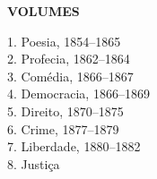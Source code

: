 \begingroup\footnotesize\parindent0pt\vspace*{3em}

\thispagestyle{empty}
{\formular\bfseries VOLUMES}\smallskip

1. Poesia, 1854–1865\\
2. Profecia, 1862–1864\\
3. Comédia, 1866–1867\\
4. Democracia, 1866–1869\\
5. Direito, 1870–1875\\
6. Crime, 1877–1879\\
7. Liberdade, 1880–1882\\
8. Justiça

\endgroup
\pagebreak